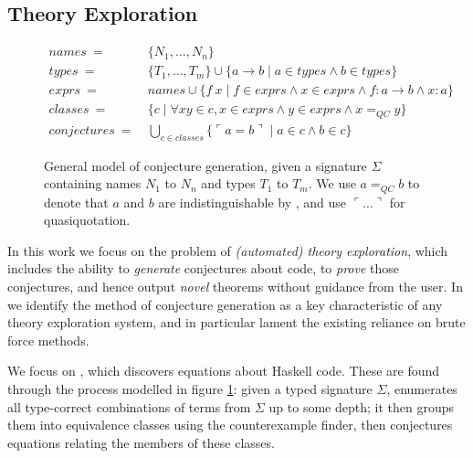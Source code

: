 \subsection{Theory Exploration}
\label{sec:theoryexploration}

\begin{figure}
  \begin{equation*}
    \begin{split}
      names\       =\ & \{ N_1, \dots, N_n \}                                                                  \\
      types\       =\ & \{ T_1, \dots, T_m \} \cup \{a \rightarrow b \mid a \in types \wedge b \in types \} \\
      exprs\       =\ & names \cup \{ f\ x \mid f \in exprs \wedge x \in exprs \wedge f : a \rightarrow b \wedge x : a \} \\
      classes\     =\ & \{c \mid \forall x y \in c, x \in exprs \wedge y \in exprs \wedge x =_{QC} y \} \\
      conjectures\ =\ & \bigcup_{c \in classes}\{ \ulcorner a = b \urcorner \mid a \in c \wedge b \in c \}
    \end{split}
  \end{equation*}

  \caption{General model of \qspec{} conjecture generation, given a signature $\Sigma$ containing names $N_1$ to $N_n$ and types $T_1$ to $T_m$. We use $a =_{QC} b$ to denote that $a$ and $b$ are indistinguishable by \qcheck{}, and use $\ulcorner \dots \urcorner$ for quasiquotation.}
  \label{fig:qspecmodel}
\end{figure}

In this work we focus on the problem of \emph{(automated) theory exploration}, which includes the ability to \emph{generate} conjectures about code, to \emph{prove} those conjectures, and hence output \emph{novel} theorems without guidance from the user. In \citep{warburtonscaling} we identify the method of conjecture generation as a key characteristic of any theory exploration system, and in particular lament the existing reliance on brute force methods.

We focus on \qspec{} \citep{QuickSpec}, which discovers equations about Haskell code. These are found through the process modelled in figure \ref{fig:qspecmodel}: \iffalse TODO: Figure just shows the syntax, it does not model any process \fi given a typed signature $\Sigma$, \qspec{} enumerates all type-correct combinations of terms from $\Sigma$ up to some depth; it then groups them into equivalence classes using the \qcheck{} counterexample finder, then conjectures equations relating the members of these classes.

